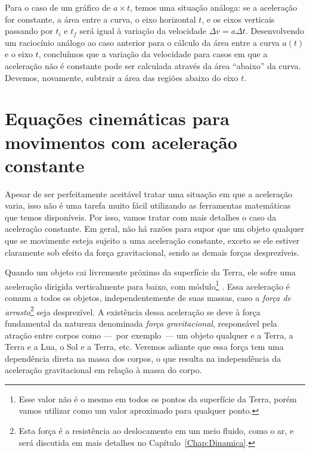 Para o caso de um gráfico de $a \times t$, temos uma situação análoga: se a aceleração for constante, a área entre a curva, o eixo horizontal $t$, e os eixos verticais passando por $t_i$ e $t_f$ será igual à variação da velocidade $\Delta v = a \Delta t$. Desenvolvendo um raciocínio análogo ao caso anterior para o cálculo da área entre a curva $a(t)$ e o eixo $t$, concluímos que a variação da velocidade para casos em que a aceleração não é constante pode ser calculada através da área ``abaixo'' da curva. Devemos, novamente, subtrair a área das regiões abaixo do eixo $t$.

\section{Equações cinemáticas para movimentos com aceleração constante}
\label{Sec:EqCinematicasParaAcelConstTransl}

Apesar de ser perfeitamente aceitável tratar uma situação em que a aceleração varia, isso não é uma tarefa muito fácil utilizando as ferramentas matemáticas que temos disponíveis. Por isso, vamos tratar com mais detalhes o caso da aceleração constante. Em geral, não há razões para supor que um objeto qualquer que se movimente esteja sujeito a uma aceleração constante, exceto se ele estiver claramente sob efeito da força gravitacional, sendo as demais forças desprezíveis. 

Quando um objeto cai livremente próximo da superfície da Terra, ele sofre uma aceleração dirigida verticalmente para baixo, com módulo\footnote{Esse valor não é o mesmo em todos os pontos da superfície da Terra, porém vamos utilizar  como um valor aproximado para qualquer ponto.} . Essa aceleração é comum a todos os objetos, independentemente de suas massas, caso a \emph{força de arrasto}\footnote{Esta força é a resistência ao deslocamento em um meio fluido, como o ar, e será discutida em mais detalhes no Capítulo~\ref{Chap:Dinamica}.} seja desprezível. A existência dessa aceleração se deve à força fundamental da natureza denominada \emph{força gravitacional}, responsável pela atração entre corpos como ---~por exemplo~--- um objeto qualquer e a Terra, a Terra e a Lua, o Sol e a Terra, etc. Veremos adiante que essa força tem uma dependência direta na massa dos corpos, o que resulta na independência da aceleração gravitacional em relação à massa do corpo.


